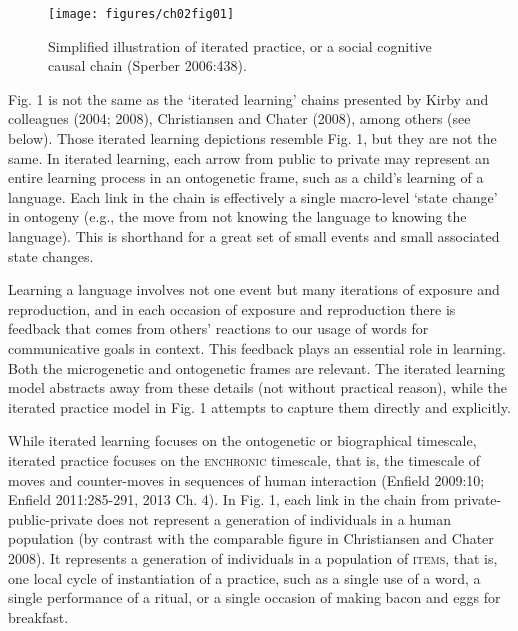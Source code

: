 \begin{figure}[h!]
\texttt{[image: figures/ch02fig01]}
\caption{Simplified illustration of iterated practice, or a social 
cognitive causal chain (Sperber 2006:438).}
\end{figure}



Fig. 1 is not the same as the \textquoteleft iterated learning' chains presented by 
Kirby and colleagues (2004; 2008), Christiansen and Chater (2008), among 
others (see below). Those iterated learning depictions resemble Fig. 1, 
but they are not the same. In iterated learning, each arrow from public 
to private may represent an entire learning process in an ontogenetic frame, such as a child's 
learning of a language. Each link in the chain is effectively a single 
macro-level \textquoteleft state change' in ontogeny (e.g., the move from not knowing 
the language to knowing the language). This is shorthand for a great set 
of small events and small associated state changes. 



Learning a language involves not one event but many iterations of 
exposure and reproduction, and in each occasion of exposure and 
reproduction there is feedback that comes from others' reactions to our 
usage of words for communicative goals in context. This feedback plays 
an essential role in learning. Both the microgenetic and ontogenetic frames are relevant. The iterated learning model abstracts 
away from these details (not without practical reason), while the 
iterated practice model in Fig. 1 attempts to capture them directly and 
explicitly. 



While iterated learning focuses on the ontogenetic or biographical 
timescale, iterated practice focuses on the \textsc{enchronic} 
timescale, that is, the timescale of moves and counter-moves in 
sequences of human interaction (Enfield 2009:10; Enfield 2011:285-291, 
2013 Ch. 4). In Fig. 1, each link in the chain from 
private-public-private does not represent a generation of individuals in 
a human population (by contrast with the comparable figure in 
Christiansen and Chater 2008). It represents a generation of individuals 
in a population of \textsc{items}, that is, one local cycle of 
instantiation of a practice, such as a single use of a word, a single 
performance of a ritual, or a single occasion of making bacon and eggs 
for breakfast. 



